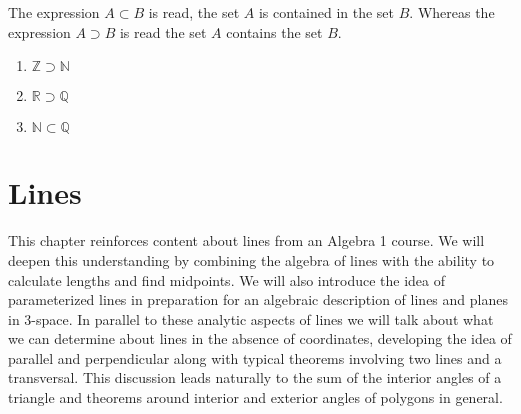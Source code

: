 \documentclass{amsbook}
\begin{document}
\begin{Answer}[ref={1a1}]
    The expression $A \subset B$ is read, the set $A$ is contained in the set $B$. Whereas the expression $A \supset B$ is read the set $A$ contains the set $B$.
    \begin{enumerate}
        \item $\mathbb{Z}\supset \mathbb{N}$
        \item $\mathbb{R}\supset \mathbb{Q}$
        \item $\mathbb{N} \subset \mathbb{Q}$
    \end{enumerate}
\end{Answer}



\chapter{Lines}
This chapter reinforces content about lines from an Algebra 1 course. We will deepen this understanding by combining the algebra of lines with the ability to calculate lengths and find midpoints. We will also introduce the idea of parameterized lines in preparation for an algebraic description of lines and planes in 3-space. In parallel to these analytic aspects of lines we will talk about what we can determine about lines in the absence of coordinates, developing the idea of parallel and perpendicular along with typical theorems involving two lines and a transversal. This discussion leads naturally to the sum of the interior angles of a triangle and theorems around interior and exterior angles of polygons in general. 
\end{document}
